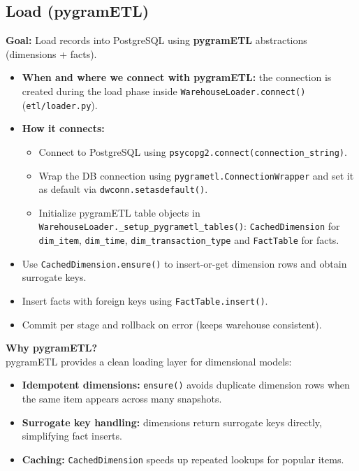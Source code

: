 \subsection{Load (pygramETL)}
\textbf{Goal:} Load records into PostgreSQL using \textbf{pygramETL} abstractions (dimensions + facts).
\begin{itemize}
  \item \textbf{When and where we connect with pygramETL:}
  the connection is created during the load phase inside \texttt{WarehouseLoader.connect()} (\texttt{etl/loader.py}).
  \item \textbf{How it connects:}
  \begin{itemize}
    \item Connect to PostgreSQL using \texttt{psycopg2.connect(connection\_string)}.
    \item Wrap the DB connection using \texttt{pygrametl.ConnectionWrapper} and set it as default via \texttt{dwconn.setasdefault()}.
    \item Initialize pygramETL table objects in \texttt{WarehouseLoader.\_setup\_pygrametl\_tables()}:
    	\texttt{CachedDimension} for \texttt{dim\_item}, \texttt{dim\_time}, \texttt{dim\_transaction\_type} and \texttt{FactTable} for facts.
  \end{itemize}
  \item Use \texttt{CachedDimension.ensure()} to insert-or-get dimension rows and obtain surrogate keys.
  \item Insert facts with foreign keys using \texttt{FactTable.insert()}.
  \item Commit per stage and rollback on error (keeps warehouse consistent).
\end{itemize}

\begin{challengebox}
\textbf{Why pygramETL?} \\
pygramETL provides a clean loading layer for dimensional models:
\begin{itemize}
  \item \textbf{Idempotent dimensions:} \texttt{ensure()} avoids duplicate dimension rows when the same item appears across many snapshots.
  \item \textbf{Surrogate key handling:} dimensions return surrogate keys directly, simplifying fact inserts.
  \item \textbf{Caching:} \texttt{CachedDimension} speeds up repeated lookups for popular items.
\end{itemize}
\end{challengebox}

